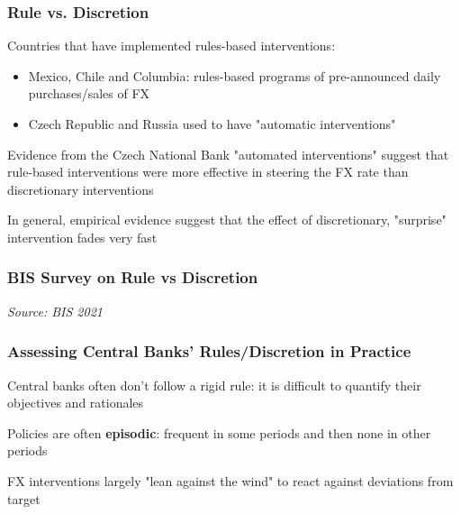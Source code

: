 \documentclass{beamer}
\newenvironment{wideitemize}{\itemize\addtolength{\itemsep}{10pt}}{\enditemize}
\begin{document}
\begin{frame}
  \frametitle{Rule vs. Discretion}

  \begin{wideitemize}

  \item Countries that have implemented rules-based interventions:
    \begin{itemize}
    \item Mexico, Chile and Columbia: rules-based programs of pre-announced daily purchases/sales of FX
    \item Czech Republic and Russia used to have "automatic interventions"
    \end{itemize}
  \item Evidence from the Czech National Bank \href{https://onlinelibrary.wiley.com/doi/10.1111/jmcb.12028}{} "automated interventions" suggest that rule-based interventions were more effective in steering the FX rate than discretionary interventions
  \item In general, empirical evidence suggest that the effect of discretionary, "surprise" intervention fades very fast    
  \end{wideitemize}  
\end{frame}


\begin{frame}
  \frametitle{BIS Survey on Rule vs Discretion}
  \medskip
  \emph{Source: BIS 2021 \href{https://www.bis.org/publ/mc_insights_fxinterventions.pdf}{}}
\end{frame}

\begin{frame}
  \frametitle{Assessing Central Banks' Rules/Discretion in Practice}
  \begin{wideitemize}
    \item Central banks often don't follow a rigid rule: it is difficult to quantify their objectives and rationales
    \item Policies are often \textbf{episodic}: frequent in some periods and then none in other periods
    \item FX interventions largely "lean against the wind" to react against deviations from target
  \end{wideitemize}  
\end{frame}
\end{document}
